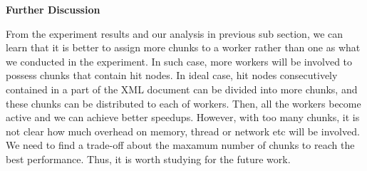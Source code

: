 \textbf{Further Discussion}

From the experiment results and our analysis in previous sub section, we can
learn that it is better to assign more chunks to a worker rather than one as
what we conducted in the experiment. In such case, more workers will be involved
to possess chunks that contain hit nodes. In ideal case, hit nodes consecutively
contained in a part of the XML document can be divided into more chunks, and
these chunks can be distributed to each of workers.  Then, all the workers
become active and we can achieve better speedups. However, with too many chunks,
it is not clear how much overhead on memory, thread or network etc will be
involved. We need to find a trade-off about the maxamum number of chunks to
reach the best performance. Thus, it is worth studying for the future work.


